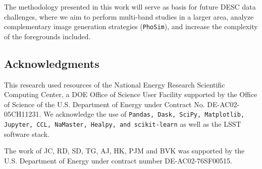 \documentclass[twocolumn]{aastex62}
\begin{document}
The methodology presented in this work will serve as basis for future DESC data challenges, where we aim to perform multi-band studies in a larger area, analyze complementary image generation strategies (\texttt{PhoSim}), and increase the complexity of the foregrounds included.


\subsection*{Acknowledgments}

This research used resources of the National Energy Research Scientific Computing Center, a DOE Office of Science User Facility supported by the Office of Science of the U.S. Department of Energy under Contract No. DE-AC02-05CH11231. We acknowledge the use of \texttt{Pandas, Dask, SciPy, Matplotlib, Jupyter, CCL, NaMaster, Healpy, and scikit-learn} as well as the LSST software stack.

The work of JC, RD, SD, TG, AJ, HK, PJM and BVK was supported by the U.S. Department of Energy under contract number DE-AC02-76SF00515.






\appendix
\end{document}
